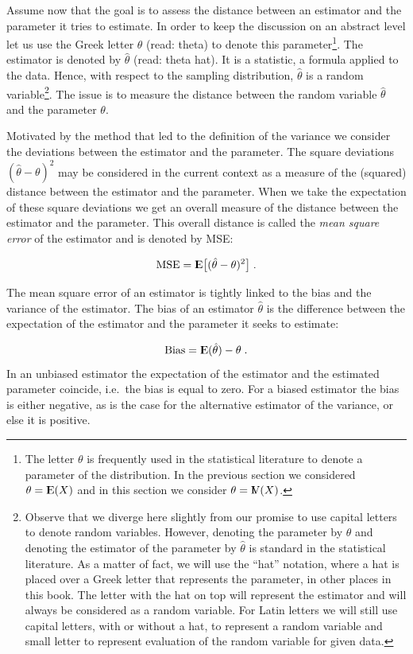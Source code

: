 \documentclass[]{krantz}
\newcommand{\Expec}{{\rm I\kern-.3em E}}
\newcommand{\Var}{{\rm I\kern-.3em V}}
\theoremstyle{definition}
\theoremstyle{definition}
\theoremstyle{definition}
\theoremstyle{remark}
\begin{document}
Assume now that the goal is to assess the distance between an estimator
and the parameter it tries to estimate. In order to keep the discussion
on an abstract level let us use the Greek letter \(\theta\) (read:
theta) to denote this parameter\footnote{The letter \(\theta\) is
  frequently used in the statistical literature to denote a parameter of
  the distribution. In the previous section we considered
  \(\theta = \Expec(X)\) and in this section we consider
  \(\theta=\Var(X)\).}. The estimator is denoted by \(\hat \theta\)
(read: theta hat). It is a statistic, a formula applied to the data.
Hence, with respect to the sampling distribution, \(\hat \theta\) is a
random variable\footnote{Observe that we diverge here slightly from our
  promise to use capital letters to denote random variables. However,
  denoting the parameter by \(\theta\) and denoting the estimator of the
  parameter by \(\hat \theta\) is standard in the statistical
  literature. As a matter of fact, we will use the ``hat'' notation,
  where a hat is placed over a Greek letter that represents the
  parameter, in other places in this book. The letter with the hat on
  top will represent the estimator and will always be considered as a
  random variable. For Latin letters we will still use capital letters,
  with or without a hat, to represent a random variable and small letter
  to represent evaluation of the random variable for given data.}. The
issue is to measure the distance between the random variable
\(\hat \theta\) and the parameter \(\theta\).

Motivated by the method that led to the definition of the variance we
consider the deviations between the estimator and the parameter. The
square deviations \((\hat \theta - \theta)^2\) may be considered in the
current context as a measure of the (squared) distance between the
estimator and the parameter. When we take the expectation of these
square deviations we get an overall measure of the distance between the
estimator and the parameter. This overall distance is called the
\emph{mean square error} of the estimator and is denoted by MSE:

\[\mathrm{MSE} = \Expec\big[(\hat \theta - \theta)^2\big]\;.\]

The mean square error of an estimator is tightly linked to the bias and
the variance of the estimator. The bias of an estimator \(\hat \theta\)
is the difference between the expectation of the estimator and the
parameter it seeks to estimate:

\[\mathrm{Bias} = \Expec(\hat \theta) - \theta\;.\] In an unbiased
estimator the expectation of the estimator and the estimated parameter
coincide, i.e.~the bias is equal to zero. For a biased estimator the
bias is either negative, as is the case for the alternative estimator of
the variance, or else it is positive.
\end{document}
